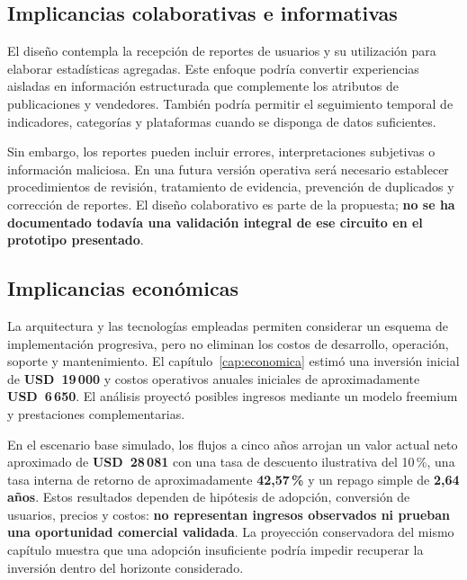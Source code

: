 \subsection{Implicancias colaborativas e informativas}\label{subsec:ml-implicancias-colaborativas}

El diseño contempla la recepción de reportes de usuarios y su utilización para elaborar estadísticas agregadas. Este enfoque podría convertir experiencias aisladas en información estructurada que complemente los atributos de publicaciones y vendedores. También podría permitir el seguimiento temporal de indicadores, categorías y plataformas cuando se disponga de datos suficientes.

Sin embargo, los reportes pueden incluir errores, interpretaciones subjetivas o información maliciosa. En una futura versión operativa será necesario establecer procedimientos de revisión, tratamiento de evidencia, prevención de duplicados y corrección de reportes. El diseño colaborativo es parte de la propuesta; \textbf{no se ha documentado todavía una validación integral de ese circuito en el prototipo presentado}.

\subsection{Implicancias económicas}\label{subsec:ml-implicancias-economicas}

La arquitectura y las tecnologías empleadas permiten considerar un esquema de implementación progresiva, pero no eliminan los costos de desarrollo, operación, soporte y mantenimiento. El capítulo~\ref{cap:economica} estimó una inversión inicial de \textbf{USD~19\,000} y costos operativos anuales iniciales de aproximadamente \textbf{USD~6\,650}. El análisis proyectó posibles ingresos mediante un modelo freemium y prestaciones complementarias.

En el escenario base simulado, los flujos a cinco años arrojan un valor actual neto aproximado de \textbf{USD~28\,081} con una tasa de descuento ilustrativa del 10\,\%, una tasa interna de retorno de aproximadamente \textbf{42,57\,\%} y un repago simple de \textbf{2,64 años}. Estos resultados dependen de hipótesis de adopción, conversión de usuarios, precios y costos: \textbf{no representan ingresos observados ni prueban una oportunidad comercial validada}. La proyección conservadora del mismo capítulo muestra que una adopción insuficiente podría impedir recuperar la inversión dentro del horizonte considerado.

